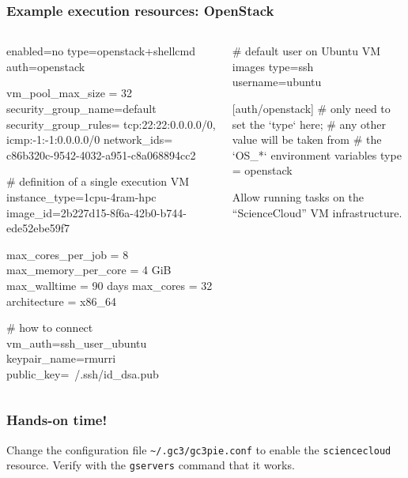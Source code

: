 \documentclass[english,serif,mathserif,usenames,dvipsnames]{beamer}
\begin{document}
\begin{frame}[fragile]
  \frametitle{Example execution resources: OpenStack}
  \begin{columns}[t]
    \begin{column}{0.5\textwidth}
\begin{stdout}
enabled=no
type=openstack+shellcmd
auth=openstack

vm_pool_max_size = 32
security_group_name=default
security_group_rules=
  tcp:22:22:0.0.0.0/0,
  icmp:-1:-1:0.0.0.0/0
network_ids=
  c86b320c-9542-4032-a951-c8a068894cc2

# definition of a single execution VM
instance_type=1cpu-4ram-hpc
image_id=2b227d15-8f6a-42b0-b744-ede52ebe59f7

max_cores_per_job = 8
max_memory_per_core = 4 GiB
max_walltime = 90 days
max_cores = 32
architecture = x86_64

# how to connect
vm_auth=ssh_user_ubuntu
keypair_name=rmurri
public_key=~/.ssh/id_dsa.pub
\end{stdout}
    \end{column}
    \begin{column}{0.5\textwidth}
      \begin{stdout}
# default user on Ubuntu VM images
type=ssh
username=ubuntu


[auth/openstack]
# only need to set the `type` here;
# any other value will be taken from
# the `OS\_*` environment variables
type = openstack
      \end{stdout}

      \+\+\+
      Allow running tasks on the ``ScienceCloud'' VM infrastructure.

    \end{column}
  \end{columns}
\end{frame}


\begin{frame}
  \frametitle{Hands-on time!}
  \begin{exercise}
    Change the configuration file
    \texttt{{\textasciitilde}/.gc3/gc3pie.conf} to enable the
    \texttt{sciencecloud} resource.  Verify with the \texttt{gservers}
    command that it works.
  \end{exercise}
\end{frame}
\end{document}
